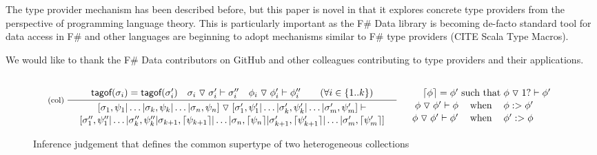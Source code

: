 \documentclass[10pt,preprint,blind,clearpagebib]{sigplanconf}
\newcommand{\ident}[1]{\textnormal{\sffamily #1}}
\newcommand{\narrow}[1]{\hspace{-0.7em} #1 \hspace{-0.7em}}
\newcommand{\tsep}[0]{\; \triangledown \;}
\newcommand{\addopt}[1]{\lceil#1\rceil}
\newcommand{\tytagof}{\ident{tagof}}
\begin{document}
The type provider mechanism has been described before, but this paper is novel in that it explores concrete
type providers from the perspective of programming language theory. This is particularly important as the
F\# Data library is becoming de-facto standard tool for data access in F\# and other 
languages are beginning to adopt mechanisms similar to F\# type providers (CITE Scala Type Macros).

\acks

We would like to thank the F\# Data contributors on GitHub and other colleagues contributing to
type providers and their applications.




\appendix

\begin{figure}
\noindent
\begin{equation*}
\inference[(col)\;]
  { \tytagof(\sigma_i) = \tytagof(\sigma'_i) \quad 
    \sigma_i \tsep \sigma'_i \vdash \sigma''_i \quad
    \phi_i \tsep \phi'_i \vdash \phi''_i \qquad (\forall i\in \{ 1 .. k \}) }
  { \begin{array}{c}
    [\sigma_1,\psi_1 | \ldots | \sigma_k,\psi_k | \ldots | \sigma_n,\psi_n ] \tsep 
    [\sigma'_1,\psi'_1 | \ldots | \sigma'_k, \psi'_k | \ldots | \sigma'_m, \psi'_m ] \vdash\\[0.1em]
    [\sigma''_1, \psi''_1 | \ldots | \sigma''_k, \psi''_k | 
        \sigma_{k+1},\addopt{\psi_{k+1}} | \ldots | \sigma_{n},\addopt{\psi_{n}} |
        \sigma'_{k+1},\addopt{\psi'_{k+1}} | \ldots | \sigma'_{m}, \addopt{\psi'_{m}} ]
    \end{array} }
\quad
\begin{array}{rcl}
 \\
 \addopt{\phi} = \phi'&\narrow{\textnormal{such that}}&\phi \tsep 1? \vdash \phi' \\[0.1em]
 \phi \tsep \phi' \vdash \phi&\narrow{\textnormal{when}}&\phi :> \phi' \\[0.1em]
 \phi \tsep \phi' \vdash \phi'&\narrow{\textnormal{when}}&\phi' :> \phi
\end{array}    
\end{equation*}
\caption{Inference judgement that defines the common supertype of two heterogeneous collections}
\label{fig:subtyping-hetcol}
\end{figure}

\end{document}
